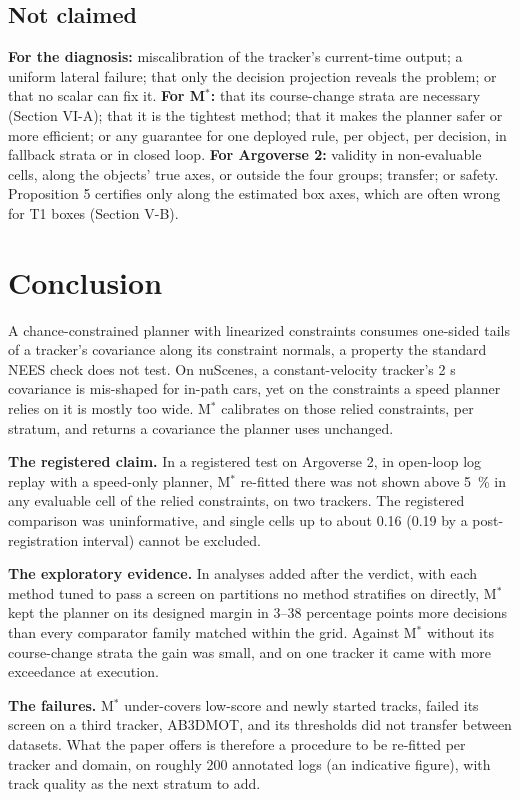 \documentclass{ieeeaccess}
\begin{document}
\subsection{Not claimed}
\textbf{For the diagnosis:} miscalibration of the tracker's current-time output; a uniform lateral failure; that only the decision projection reveals the problem; or that no scalar can fix it. \textbf{For M$^{*}$:} that its course-change strata are necessary (Section VI-A); that it is the tightest method; that it makes the planner safer or more efficient; or any guarantee for one deployed rule, per object, per decision, in fallback strata or in closed loop. \textbf{For Argoverse 2:} validity in non-evaluable cells, along the objects' true axes, or outside the four groups; transfer; or safety. Proposition 5 certifies only along the estimated box axes, which are often wrong for T1 boxes (Section V-B).

\section{Conclusion}
A chance-constrained planner with linearized constraints consumes one-sided tails of a tracker's covariance along its constraint normals, a property the standard NEES check does not test. On nuScenes, a constant-velocity tracker's 2 s covariance is mis-shaped for in-path cars, yet on the constraints a speed planner relies on it is mostly too wide. M$^{*}$ calibrates on those relied constraints, per stratum, and returns a covariance the planner uses unchanged.

\textbf{The registered claim.} In a registered test on Argoverse 2, in open-loop log replay with a speed-only planner, M$^{*}$ re-fitted there was not shown above 5~\% in any evaluable cell of the relied constraints, on two trackers. The registered comparison was uninformative, and single cells up to about 0.16 (0.19 by a post-registration interval) cannot be excluded.

\textbf{The exploratory evidence.} In analyses added after the verdict, with each method tuned to pass a screen on partitions no method stratifies on directly, M$^{*}$ kept the planner on its designed margin in 3--38 percentage points more decisions than every comparator family matched within the grid. Against M$^{*}$ without its course-change strata the gain was small, and on one tracker it came with more exceedance at execution.

\textbf{The failures.} M$^{*}$ under-covers low-score and newly started tracks, failed its screen on a third tracker, AB3DMOT, and its thresholds did not transfer between datasets. What the paper offers is therefore a procedure to be re-fitted per tracker and domain, on roughly 200 annotated logs (an indicative figure), with track quality as the next stratum to add.
\end{document}
